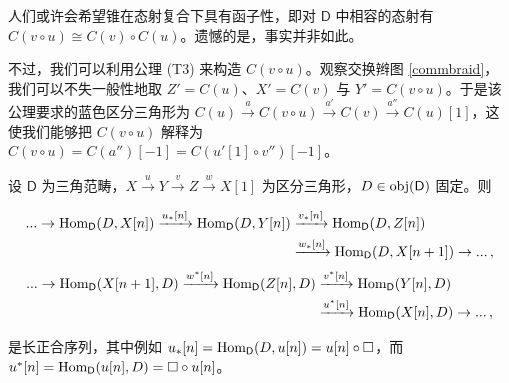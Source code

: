 \begin{Rem}
	人们或许会希望锥在态射复合下具有函子性，即对 $\mathsf{D}$ 中相容的态射有 $C(v\circ u)\cong C(v)\circ C(u)$。遗憾的是，事实并非如此。
	
	不过，我们可以利用公理 (T3) 来构造 $C(v\circ u)$。观察交换辫图 \eqref{commbraid}，我们可以不失一般性地取 $Z'=C(u)$、$X'=C(v)$ 与 $Y'=C(v\circ u)$。于是该公理要求的蓝色区分三角形为 $C(u)\xrightarrow{a} C(v\circ u)\xrightarrow{a'} C(v)\xrightarrow{a''} C(u)[1]$，这使我们能够把 $C(v\circ u)$ 解释为 $C(v\circ u)=C(a'')[-1]=C(u'[1]\circ v'')[-1]$。
\end{Rem} 

\begin{Pro}\label{Homareexact}
	设 $\mathsf{D}$ 为三角范畴，$X\xrightarrow{u} Y\xrightarrow{v} Z\xrightarrow{w} X[1]$ 为区分三角形，$D\in\textup{obj}(\mathsf{D})$ 固定。则\begin{normalsize}
		\begin{align}\label{covHomexact}
			...\rightarrow \textup{Hom}_\mathsf{D}(D,X[n])\xrightarrow{u_*[n]} \textup{Hom}_\mathsf{D}(D,Y[n])&\xrightarrow{v_*[n]}\textup{Hom}_\mathsf{D}(D,Z[n]) \\
			&\xrightarrow{w_*[n]}\textup{Hom}_\mathsf{D}(D,X[n+1])\rightarrow...\,, \nonumber
		\end{align}
		\begin{align}\label{contraHomexact}
			...\rightarrow \textup{Hom}_\mathsf{D}(X[n+1],D)\xrightarrow{w^*[n]} \textup{Hom}_\mathsf{D}(Z[n],D)&\xrightarrow{v^*[n]}\textup{Hom}_\mathsf{D}(Y[n],D) \\
			&\xrightarrow{u^*[n]}\textup{Hom}_\mathsf{D}(X[n],D)\rightarrow...\,, \nonumber
		\end{align}
	\end{normalsize}是长正合序列，其中例如 $u_*[n]=\textup{Hom}_\mathsf{D}(D,u[n])=u[n]\circ\square$，而 $u^*[n]=\textup{Hom}_\mathsf{D}(u[n],D)=\square\circ u[n]$。
\end{Pro}

